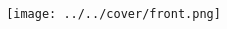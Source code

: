 \documentclass[aspectratio=169]{beamer}
\begin{document}
\begin{frame}
\begin{columns}
\begin{column}{0.48\textwidth}
\titlepage
\end{column}
\begin{column}{0.48\textwidth}
\begin{center}
\texttt{[image: ../../cover/front.png]}
\end{center}
\end{column}
\end{columns}
\end{frame}

\end{document}
